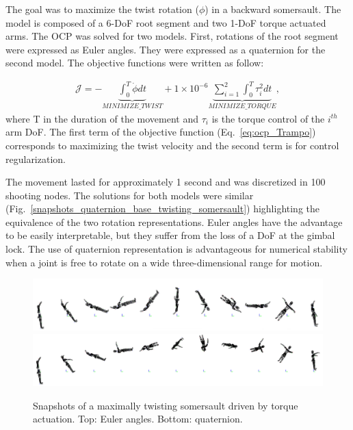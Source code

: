 The goal was to maximize the twist rotation ($\phi$) in a backward somersault.
The model is composed of a 6-DoF root segment and two 1-DoF torque actuated arms.
The OCP was solved for two models.
First, rotations of the root segment were expressed as Euler angles.
They were expressed as a quaternion for the second model.
The objective functions were written as follow:

\begin{eqnarray}\label{eq:ocp_Trampo}
\mathcal{J} = -\underbrace{\int_0^T \dot{\phi} dt}_{MINIMIZE\_TWIST}  +  1\times 10^{-6} \underbrace{\sum_{i=1}^{2}\int_0^T \tau_{i}^2 dt}_{MINIMIZE\_ TORQUE},
\end{eqnarray}
where T in the duration of the movement and $\tau_{i}$ is the torque control of the $i^{th}$ arm DoF.
The first term of the objective function (Eq.~\ref{eq:ocp_Trampo}) corresponds to maximizing the twist velocity and the second term is for control regularization.


The movement lasted for approximately 1 second and was discretized in 100 shooting nodes.
The solutions for both models were similar (Fig.~\ref{snapshots_quaternion_base_twisting_somersault}) highlighting the equivalence of the two rotation representations.
Euler angles have the advantage to be easily interpretable, but they suffer from the loss of a DoF at the gimbal lock.
The use of quaternion representation is advantageous for numerical stability when a joint is free to rotate on a wide three-dimensional range for motion.


\begin{figure}[t!]
\centering
\includegraphics[width=\textwidth]{figures/Euler_Bioptim_MaxVrille.png}\\
\vspace*{0.5em}
\includegraphics[width=\textwidth]{figures/Quat_Bioptim_MaxVrille.png}
\caption{Snapshots of a maximally twisting somersault driven by torque actuation. Top: Euler angles. Bottom: quaternion.}
\label{fig:snapshots_quaternion_base_twisting_somersault}
\end{figure}


